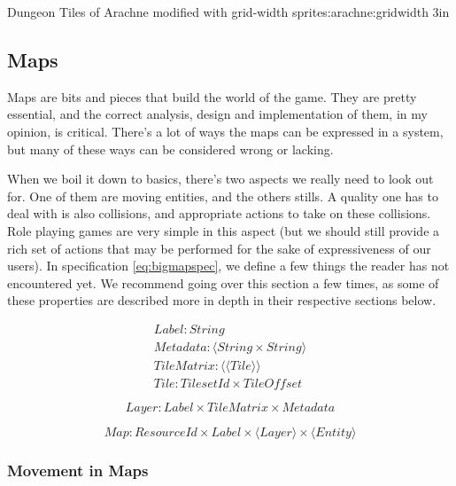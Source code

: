 %
       {Dungeon Tiles of Arachne modified with grid-width}%
       {sprites:arachne:gridwidth}%
       {3in}

\subsection{Maps}

Maps are bits and pieces that build the world of the game. They are pretty
essential, and the correct analysis, design and implementation of them, in my
opinion, is critical. There's a lot of ways the maps can be expressed in a
system, but many of these ways can be considered wrong or lacking.

When we boil it down to basics, there's two aspects we really need to look out
for. One of them are moving entities, and the others stills. A quality one has
to deal with is also collisions, and appropriate actions to take on these
collisions. Role playing games are very simple in this aspect (but we should
still provide a rich set of actions that may be performed for the sake of
expressiveness of our users). In specification \ref{eq:bigmapspec}, we define a
few things the reader has not encountered yet. We recommend going over this
section a few times, as some of these properties are described more in depth in
their respective sections below.

\begin{equation}
\begin{split} \label{eq:bigmapspec}
Label\colon String \\
Metadata\colon \langle String \times String \rangle \\
TileMatrix\colon \langle \langle Tile \rangle \rangle \\
Tile\colon TilesetId \times TileOffset
\end{split}
\end{equation}

\begin{equation}
Layer\colon Label \times TileMatrix \times Metadata
\end{equation}

\begin{equation}
Map\colon ResourceId \times Label \times \langle Layer \rangle \times \langle Entity \rangle
\end{equation}

\subsubsection{Movement in Maps}

